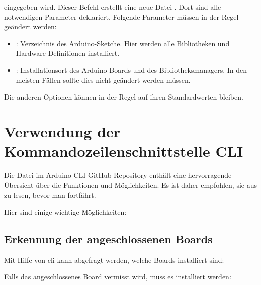 \medskip


\medskip

eingegeben wird. Dieser Befehl erstellt eine neue Datei . Dort sind alle notwendigen Parameter deklariert. Folgende Parameter müssen in der Regel geändert werden:

\begin{itemize}
	\item {}: Verzeichnis des Arduino-Sketche. Hier werden alle Bibliotheken und Hardware-Definitionen installiert.
	\item {}:  Installationsort des Arduino-Boards und des Bibliotheksmanagers. In den meisten Fällen sollte dies nicht geändert werden müssen.
\end{itemize}


Die anderen Optionen können in der Regel auf ihren Standardwerten bleiben.




\section{Verwendung der Kommandozeilenschnittstelle CLI}

Die Datei  im Arduino CLI GitHub Repository enthält eine hervorragende Übersicht über die Funktionen und Möglichkeiten.\cite{ArduinoCLIGit:2022} 
Es ist daher empfohlen, sie aus zu lesen, bevor man  fortfährt. 

\medskip

Hier sind einige wichtige Möglichkeiten:


\subsection{Erkennung der angeschlossenen Boards}




Mit Hilfe von \ac{cli} kann abgefragt werden, welche Boards installiert sind:

\medskip



\medskip

Falls das angeschlossenes Board vermisst wird, muss es installiert werden:

\medskip


\medskip

